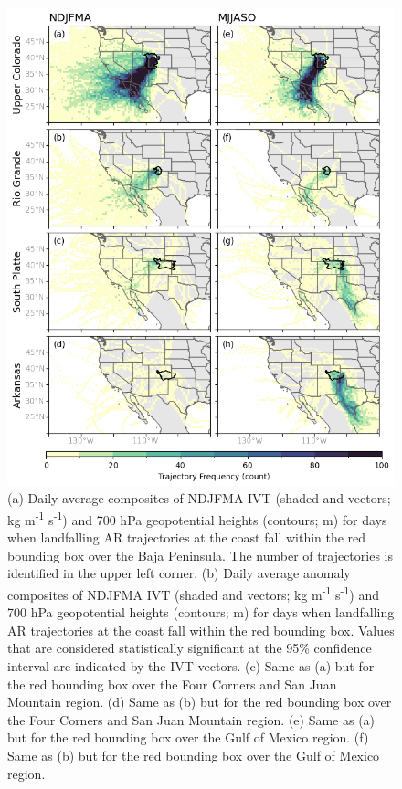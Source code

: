 \documentclass[draft]{agujournal2019}
\begin{document}
\begin{figure}
\noindent\includegraphics[width=\textwidth, height=\textheight, keepaspectratio]{fig5.png}

\caption{(a) Daily average composites of NDJFMA IVT (shaded and vectors; kg m\textsuperscript{-1} s\textsuperscript{-1}) and 700 hPa geopotential heights (contours; m) for days when landfalling AR trajectories at the coast fall within the red bounding box over the Baja Peninsula. The number of trajectories is identified in the upper left corner. (b) Daily average anomaly composites of NDJFMA IVT (shaded and vectors; kg m\textsuperscript{-1} s\textsuperscript{-1}) and 700 hPa geopotential heights (contours; m) for days when landfalling AR trajectories at the coast fall within the red bounding box. Values that are considered statistically significant at the 95\% confidence interval are indicated by the IVT vectors. (c) Same as (a) but for the red bounding box over the Four Corners and San Juan Mountain region. (d) Same as (b) but for the red bounding box over the Four Corners and San Juan Mountain region. (e) Same as (a) but for the red bounding box over the Gulf of Mexico region. (f) Same as (b) but for the red bounding box over the Gulf of Mexico region.}
\label{fig:composites_NDJFMA}
\end{figure}
\end{document}
